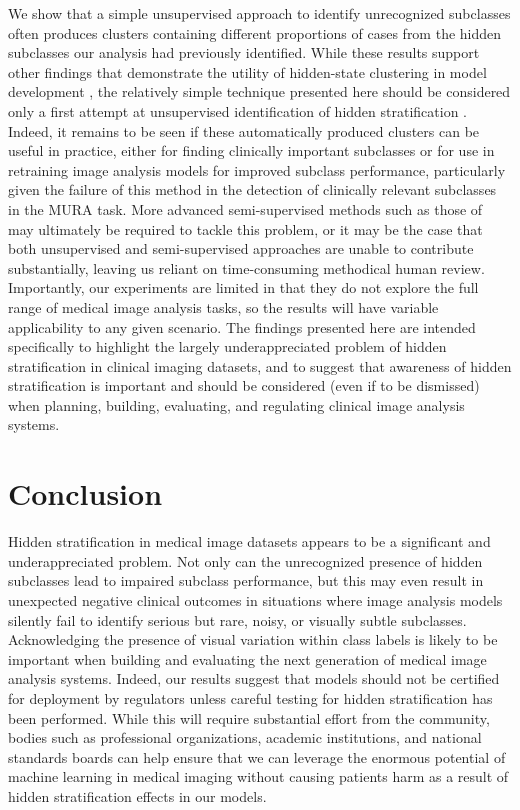 \documentclass[sigconf]{acmart}
\begin{document}
We show that a simple unsupervised approach to identify unrecognized subclasses often produces clusters containing different proportions of cases from the hidden subclasses our analysis had previously identified. 
While these results support other findings that demonstrate the utility of hidden-state clustering in model development \citep{Liu2019-qt}, the relatively simple technique presented here should be considered only a first attempt at unsupervised identification of hidden stratification \citep{calinski1974dendrite, rousseeuw1987silhouettes}. 
Indeed, it remains to be seen if these automatically produced clusters can be useful in practice, either for finding clinically important subclasses or for use in retraining image analysis models for improved subclass performance, particularly given the failure of this method in the detection of clinically relevant subclasses in the MURA task. 
More advanced semi-supervised methods such as those of \citep{chen2019slicing} may ultimately be required to tackle this problem, or it may be the case that both unsupervised and semi-supervised approaches are unable to contribute substantially, leaving us reliant on time-consuming methodical human review.
Importantly, our experiments are limited in that they do not explore the full range of medical image analysis tasks, so the results will have variable applicability to any given scenario.
The findings presented here are intended specifically to highlight the largely underappreciated problem of hidden stratification in clinical imaging datasets, and to suggest that awareness of hidden stratification is important and should be considered (even if to be dismissed) when planning, building, evaluating, and regulating clinical image analysis systems.
 
\section{Conclusion}

Hidden stratification in medical image datasets appears to be a significant and underappreciated problem. 
Not only can the unrecognized presence of hidden subclasses lead to impaired subclass performance, but this may even result in unexpected negative clinical outcomes in situations where image analysis models silently fail to identify serious but rare, noisy, or visually subtle subclasses.
Acknowledging the presence of visual variation within class labels is likely to be important when building and evaluating the next generation of medical image analysis systems.
Indeed, our results suggest that models should not be certified for deployment by regulators unless careful testing for hidden stratification has been performed.
While this will require substantial effort from the community, bodies such as professional organizations, academic institutions, and national standards boards can help ensure that we can leverage the enormous potential of machine learning in medical imaging without causing patients harm as a result of hidden stratification effects in our models.
\end{document}
